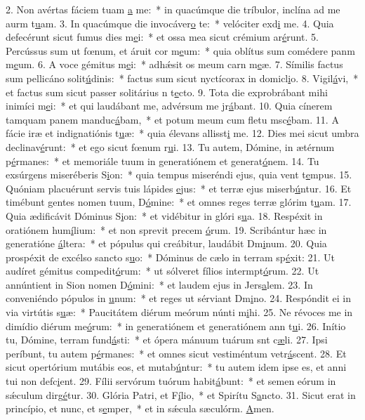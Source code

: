 2. Non avértas fáciem tuam \uline{a} me:~* in quacúmque die tríbulor, inclína ad me aurm t\uline{u}am.
3. In quacúmque die invocáver\uline{o} te:~* velóciter exd\uline{i} me.
4. Quia defecérunt sicut fumus dies m\uline{e}i:~* et ossa mea sicut crémium ar\uline{é}runt.
5. Percússus sum ut fœnum, et áruit cor m\uline{e}um:~* quia oblítus sum comédere panm m\uline{e}um.
6. A voce gémitus m\uline{e}i:~* adhǽsit os meum carn m\uline{e}æ.
7. Símilis factus sum pellicáno solit\uline{ú}dinis:~* factus sum sicut nyctícorax in domicl\uline{i}o.
8. Vigil\uline{á}vi,~* et factus sum sicut passer solitárius n t\uline{e}cto.
9. Tota die exprobrábant mihi inimíci m\uline{e}i:~* et qui laudábant me, advérsum me jr\uline{á}bant.
10. Quia cínerem tamquam panem manduc\uline{á}bam,~* et potum meum cum fletu msc\uline{é}bam.
11. A fácie iræ et indignatiónis t\uline{u}æ:~* quia élevans allisst\uline{i} me.
12. Dies mei sicut umbra declinav\uline{é}runt:~* et ego sicut fœnum r\uline{u}i.
13. Tu autem, Dómine, in ætérnum p\uline{é}rmanes:~* et memoriále tuum in generatiónem et generat\uline{ó}nem.
14. Tu exsúrgens miseréberis S\uline{i}on:~* quia tempus miseréndi ejus, quia vent t\uline{e}mpus.
15. Quóniam placuérunt servis tuis lápides \uline{e}jus:~* et terræ ejus miserb\uline{ú}ntur.
16. Et timébunt gentes nomen tuum, D\uline{ó}mine:~* et omnes reges terræ glórim t\uline{u}am.
17. Quia ædificávit Dóminus S\uline{i}on:~* et vidébitur in glóri s\uline{u}a.
18. Respéxit in oratiónem hum\uline{í}lium:~* et non sprevit precem \uline{ó}rum.
19. Scribántur hæc in generatióne \uline{á}ltera:~* et pópulus qui creábitur, laudábit Dm\uline{i}num.
20. Quia prospéxit de excélso sancto s\uline{u}o:~* Dóminus de cælo in terram sp\uline{é}xit:
21. Ut audíret gémitus compedit\uline{ó}rum:~* ut sólveret fílios intermpt\uline{ó}rum.
22. Ut annúntient in Sion nomen D\uline{ó}mini:~* et laudem ejus in Jers\uline{a}lem.
23. In conveniéndo pópulos in \uline{u}num:~* et reges ut sérviant Dm\uline{i}no.
24. Respóndit ei in via virtútis s\uline{u}æ:~* Paucitátem diérum meórum núnti m\uline{i}hi.
25. Ne révoces me in dimídio diérum me\uline{ó}rum:~* in generatiónem et generatiónem ann t\uline{u}i.
26. Inítio tu, Dómine, terram fund\uline{á}sti:~* et ópera mánuum tuárum snt c\uline{æ}li.
27. Ipsi períbunt, tu autem p\uline{é}rmanes:~* et omnes sicut vestiméntum vetr\uline{á}scent.
28. Et sicut opertórium mutábis eos, et mutab\uline{ú}ntur:~* tu autem idem ipse es, et anni tui non defc\uline{i}ent.
29. Fílii servórum tuórum habit\uline{á}bunt:~* et semen eórum in sǽculum dirg\uline{é}tur.
30. Glória Patri, et F\uline{í}lio,~* et Spirítu S\uline{a}ncto.
31. Sicut erat in princípio, et nunc, et s\uline{e}mper,~* et in sǽcula sæculórm. \uline{A}men.
